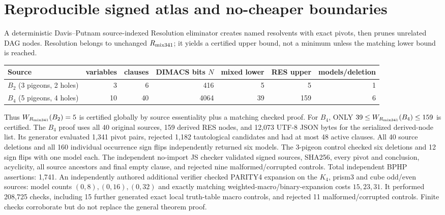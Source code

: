 \documentclass[11pt]{article}
\begin{document}
\section{Reproducible signed atlas and no-cheaper boundaries}
A deterministic Davis--Putnam source-indexed Resolution eliminator creates named resolvents with exact pivots, then prunes unrelated DAG nodes. Resolution belongs to unchanged $R_{\rm mix341}$; it yields a certified upper bound, not a minimum unless the matching lower bound is reached.
\begin{center}\begin{tabular}{lrrrrrr}
\toprule
Source & variables & clauses & DIMACS bits $N$ & mixed lower & RES upper & models/deletion\\
\midrule
$B_2$ (3 pigeons, 2 holes)&3&6&416&5&5&1\\
$B_4$ (5 pigeons, 4 holes)&10&40&4064&39&159&6\\
\bottomrule
\end{tabular}\end{center}
Thus $W_{R_{\rm mix341}}(B_2)=5$ is certified globally by source essentiality plus a matching checked proof. For $B_4$, ONLY $39\le W_{R_{\rm mix341}}(B_4)\le159$ is certified. The $B_4$ proof uses all 40 original sources, 159 derived RES nodes, and 12,073 UTF-8 JSON bytes for the serialized derived-node list. Its generator evaluated 1,341 pivot pairs, rejected 1,182 tautological candidates and had at most 48 active clauses. All 40 source deletions and all 160 individual occurrence sign flips independently returned six models. The 3-pigeon control checked six deletions and 12 sign flips with one model each. The independent no-import JS checker validated signed sources, SHA256, every pivot and conclusion, acyclicity, all source ancestors and final empty clause, and rejected nine malformed/corrupted controls. Total independent BPHP assertions: 1,741.
An independently authored additional verifier checked PARITY4 expansion on the $K_4$, prism3 and cube odd/even sources: model counts $(0,8),(0,16),(0,32)$ and exactly matching weighted-macro/binary-expansion costs $15,23,31$. It performed 208,725 checks, including 15 further generated exact local truth-table macro controls, and rejected 11 malformed/corrupted controls. Finite checks corroborate but do not replace the general theorem proof.
\end{document}
